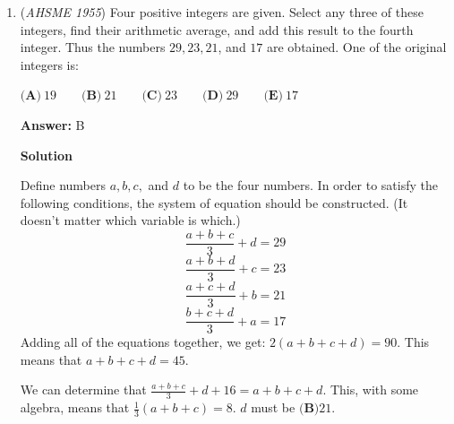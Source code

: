 \begin{enumerate}
 $\textbf{(A)}\ \text{5 and 9}\qquad\textbf{(B)}\ \text{9 and 5}\qquad\textbf{(C)}\ \text{impossible to tell}\qquad\textbf{(D)}\ \text{5 and 4}\qquad\textbf{(E)}\ \text{4 and 5}$

 \textbf{Answer: }B



\textbf{Solution}

We can set up the subtraction like this:
 \[\text{ h t u}\]
 \[- \text{u t h}\]
 \[-------\]
 \[\text{? ? 4}\]Since $u < h$, we need to borrow the one from the tens column. Since the result of the tens column is 0, the taken 1 would result in the tens digit being 9:

 
 \[\text{ h t u}\]
 \[- \text{u t h}\]
 \[-------\]
 \[\text{? 9 4}\]We can assign a value for $u$ and $h$, since that doesn't impact the difference, so lets say that $u=3$ and $h=9$.
 \[\text{ 9 t 3}\]
 \[- \text{3 t 9}\]
 \[-------\]
 \[\text{? 9 4}\]Since $t < t+1$, we can subtract one from the hundred's digit:
 \[\text{ 9 t 3}\]
 \[- \text{3 t 9}\]
 \[-------\]
 \[\text{5 9 4}\]Out difference is $594$. Therefore, the next two digits, from right to left, are $\boxed{\textbf{(B) } \text{9 and 5}}$.

 


	\item (\textit{AHSME 1955}) Four positive integers are given. Select any three of these integers, find their arithmetic average, 
and add this result to the fourth integer. Thus the numbers $29, 23, 21$, and $17$ are obtained. One of the original integers is: 


 $\textbf{(A)}\ 19 \qquad \textbf{(B)}\ 21 \qquad \textbf{(C)}\ 23 \qquad \textbf{(D)}\ 29 \qquad \textbf{(E)}\ 17$

 \textbf{Answer: }B



\textbf{Solution}

Define numbers $a, b, c,$ and $d$ to be the four numbers. In order to satisfy the following conditions, the system of equation should be constructed. (It doesn't matter which variable is which.)
 \[\frac{a+b+c}{3}+d=29\]
 \[\frac{a+b+d}{3}+c=23\]
 \[\frac{a+c+d}{3}+b=21\]
 \[\frac{b+c+d}{3}+a=17\]Adding all of the equations together, we get: $2(a+b+c+d)=90$. This means that $a+b+c+d=45$.

 We can determine that $\frac{a+b+c}{3}+d+16=a+b+c+d$. This, with some algebra, means that $\frac{1}{3}(a+b+c)=8$. $d$ must be $\boxed{\textbf{(B)} 21}$.

 



\end{enumerate}
